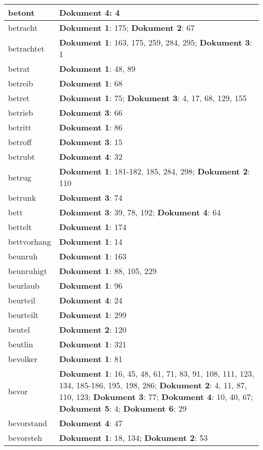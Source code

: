 \documentclass[a5paper]{article}
\begin{document}
\begin{longtable}[l]{|l|p{3in}|}
\hline
betont & \textbf{Dokument 4}: 4 \\
\hline
betracht & \textbf{Dokument 1}: 175; \textbf{Dokument 2}: 67 \\
\hline
betrachtet & \textbf{Dokument 1}: 163, 175, 259, 284, 295; \textbf{Dokument 3}: 1 \\
\hline
betrat & \textbf{Dokument 1}: 48, 89 \\
\hline
betreib & \textbf{Dokument 1}: 68 \\
\hline
betret & \textbf{Dokument 1}: 75; \textbf{Dokument 3}: 4, 17, 68, 129, 155 \\
\hline
betrieb & \textbf{Dokument 3}: 66 \\
\hline
betritt & \textbf{Dokument 1}: 86 \\
\hline
betroff & \textbf{Dokument 3}: 15 \\
\hline
betrubt & \textbf{Dokument 4}: 32 \\
\hline
betrug & \textbf{Dokument 1}: 181-182, 185, 284, 298; \textbf{Dokument 2}: 110 \\
\hline
betrunk & \textbf{Dokument 3}: 74 \\
\hline
bett & \textbf{Dokument 3}: 39, 78, 192; \textbf{Dokument 4}: 64 \\
\hline
bettelt & \textbf{Dokument 1}: 174 \\
\hline
bettvorhang & \textbf{Dokument 1}: 14 \\
\hline
beunruh & \textbf{Dokument 1}: 163 \\
\hline
beunruhigt & \textbf{Dokument 1}: 88, 105, 229 \\
\hline
beurlaub & \textbf{Dokument 1}: 96 \\
\hline
beurteil & \textbf{Dokument 4}: 24 \\
\hline
beurteilt & \textbf{Dokument 1}: 299 \\
\hline
beutel & \textbf{Dokument 2}: 120 \\
\hline
beutlin & \textbf{Dokument 1}: 321 \\
\hline
bevolker & \textbf{Dokument 1}: 81 \\
\hline
bevor & \textbf{Dokument 1}: 16, 45, 48, 61, 71, 83, 91, 108, 111, 123, 134, 185-186, 195, 198, 286; \textbf{Dokument 2}: 4, 11, 87, 110, 123; \textbf{Dokument 3}: 77; \textbf{Dokument 4}: 10, 40, 67; \textbf{Dokument 5}: 4; \textbf{Dokument 6}: 29 \\
\hline
bevorstand & \textbf{Dokument 4}: 47 \\
\hline
bevorsteh & \textbf{Dokument 1}: 18, 134; \textbf{Dokument 2}: 53 \\

\end{longtable}
\end{document}
